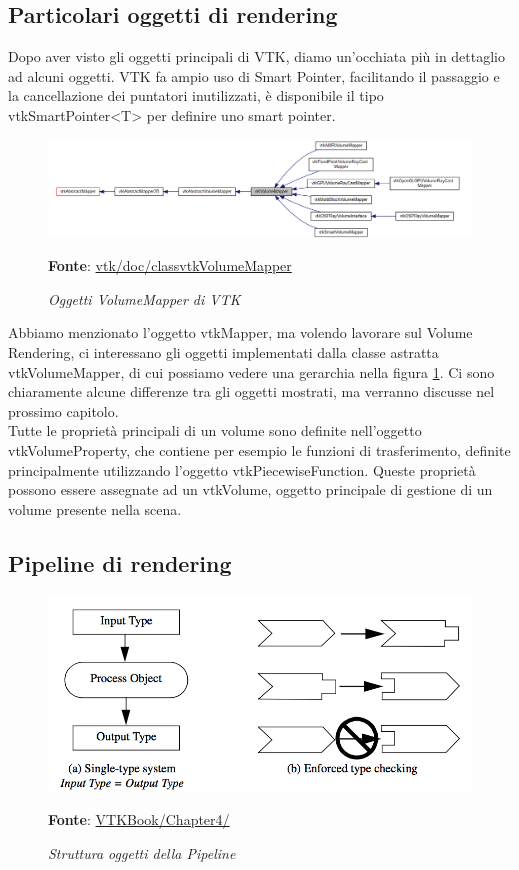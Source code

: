 \subsection{Particolari oggetti di rendering}
Dopo aver visto gli oggetti principali di VTK, diamo un'occhiata più in dettaglio ad alcuni oggetti. VTK fa ampio uso di Smart Pointer, facilitando il passaggio e la cancellazione dei puntatori inutilizzati, è disponibile il tipo vtkSmartPointer<T> per definire uno smart pointer.

\begin{figure}[h]
    \centering
    \includegraphics[scale=0.4]{immagini/volumerendering/mappers.png}
    \caption{\textit{Oggetti VolumeMapper di VTK}}
    \textbf{Fonte}: \href{https://vtk.org/doc/nightly/html/classvtkVolumeMapper.html}{vtk/doc/classvtkVolumeMapper}
    \label{fig: Gerarchia di VolumeMapper}
\end{figure}

Abbiamo menzionato l'oggetto vtkMapper, ma volendo lavorare sul Volume Rendering, ci interessano gli oggetti implementati dalla classe astratta vtkVolumeMapper, di cui possiamo vedere una gerarchia nella figura \ref{fig: Gerarchia di VolumeMapper}. Ci sono chiaramente alcune differenze tra gli oggetti mostrati, ma verranno discusse nel prossimo capitolo.
\\
Tutte le proprietà principali di un volume sono definite nell'oggetto vtkVolumeProperty, che contiene per esempio le funzioni di trasferimento, definite principalmente utilizzando l'oggetto vtkPiecewiseFunction. Queste proprietà possono essere assegnate ad un vtkVolume, oggetto principale di gestione di un volume presente nella scena.

\subsection{Pipeline di rendering}

\begin{figure}[h]
    \centering
    \includegraphics[scale=0.35]{immagini/volumerendering/pipeline.png}
    \caption{\textit{Struttura oggetti della Pipeline}}
    \textbf{Fonte}: \href{https://lorensen.github.io/VTKExamples/site/VTKBook/04Chapter4/}{VTKBook/Chapter4/}
    \label{fig: Struttura Pipeline}
\end{figure}

